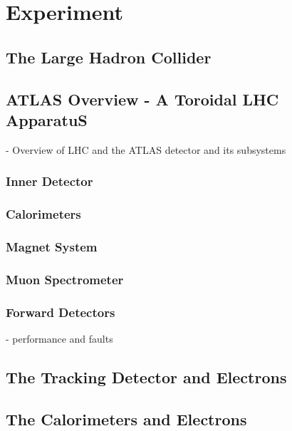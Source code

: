 \chapter{Experiment}

\section{The Large Hadron Collider}


\section{ATLAS Overview - A Toroidal LHC ApparatuS}
{\normalsize - Overview of LHC and the ATLAS detector and its subsystems}

\subsection{Inner Detector}
\subsection{Calorimeters}
\subsection{Magnet System}
\subsection{Muon Spectrometer}
\subsection{Forward Detectors}


- performance and faults

\section{The Tracking Detector and Electrons}


\section{The Calorimeters and Electrons}
